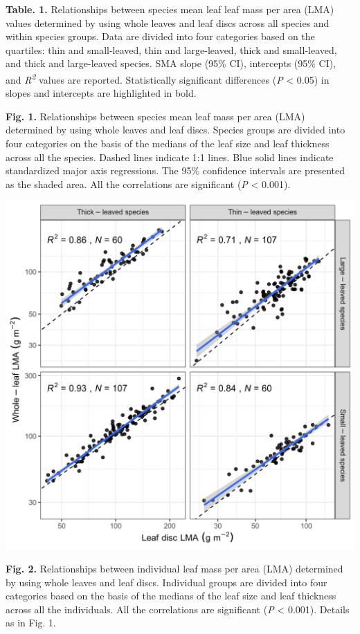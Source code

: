 \documentclass[
  12pt,
  a4paper,
,tablecaptionabove
]{scrartcl}
\begin{document}
\textbf{Table. 1.} Relationships between species mean leaf leaf mass per
area (LMA) values determined by using whole leaves and leaf discs across
all species and within species groups. Data are divided into four
categories based on the quartiles: thin and small-leaved, thin and
large-leaved, thick and small-leaved, and thick and large-leaved
species. SMA slope (95\% CI), intercepts (95\% CI), and
\emph{R\textsuperscript{2}} values are reported. Statistically
significant differences (\emph{P} \textless{} 0.05) in slopes and
intercepts are highlighted in bold.

\newpage

\textbf{Fig. 1.} Relationships between species mean leaf mass per area
(LMA) determined by using whole leaves and leaf discs. Species groups
are divided into four categories on the basis of the medians of the leaf
size and leaf thickness across all the species. Dashed lines indicate
1:1 lines. Blue solid lines indicate standardized major axis
regressions. The 95\% confidence intervals are presented as the shaded
area. All the correlations are significant (\emph{P} \textless{} 0.001).

\includegraphics{../figs/lalt_pool_grid.png}

\newpage

\textbf{Fig. 2.} Relationships between individual leaf mass per area
(LMA) determined by using whole leaves and leaf discs. Individual groups
are divided into four categories based on the basis of the medians of
the leaf size and leaf thickness across all the individuals. All the
correlations are significant (\emph{P} \textless{} 0.001). Details as in
Fig. 1.
\end{document}
